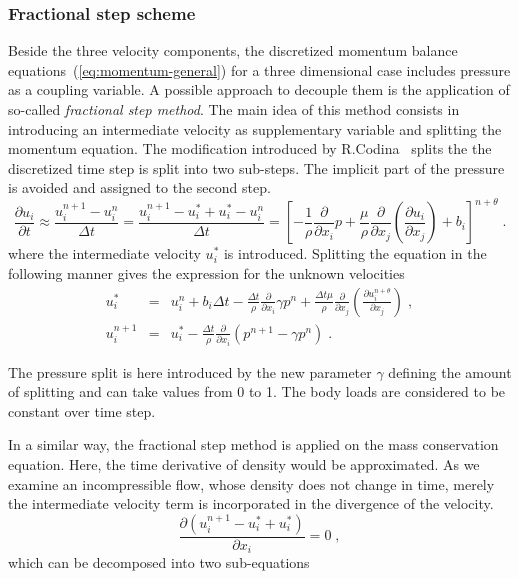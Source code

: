 \documentclass[a4paper]{article}
\newcommand{\pard}[2]{\frac{\partial{#1}}{\partial{#2}}}
\begin{document}
\subsubsection{Fractional step scheme}
Beside the three velocity components, the discretized momentum balance equations~(\ref{eq:momentum-general}) for a three dimensional case includes pressure as a coupling variable. A possible approach to decouple them is the application of so-called \emph{fractional step method}. The main idea of this method consists in introducing an intermediate velocity as supplementary variable and splitting the momentum equation. The modification introduced by R.Codina~\cite{Codina01} splits the the discretized time step is split into two sub-steps. The implicit part of the pressure is avoided and assigned to the second step.
\begin{equation}
  \pard{u_i}{t} \approx \frac{u^{n+1}_i-u^n_i}{\Delta t}=\frac{u^{n+1}_i-u^*_i+u^*_i-u^n_i}{\Delta t}= \left[ - \frac{1}{\rho}\frac{\partial}{\partial x_i}p+\frac{\mu}{\rho}\frac{\partial}{\partial x_j}\left(\frac{\partial u_i}{\partial x_j}\right)+b_i\right]^{n+\theta}\;.
\end{equation}
where the intermediate velocity $u^*_i$ is introduced. Splitting the equation in the following manner gives the expression for the unknown velocities
\begin{eqnarray}\label{rce:uistar}
    u^*_i &=& u^n_i+b_i\Delta t - \frac{\Delta t}{\rho}\pard{}{x_i}\gamma p^n+\frac{\Delta t\mu}{\rho}\pard{}{x_j}\left(\pard{u^{n+\theta}_i}{x_j}\right)\;,\\
    u^{n+1}_i &=& u^*_i- \frac{\Delta t}{\rho}\pard{}{x_i}(p^{n+1}-\gamma p^n)\;. \label{eq:uin1}
\end{eqnarray}

The pressure split is here introduced by the new parameter $\gamma$ defining the amount of splitting and can take values from 0 to 1. The body loads are considered to be constant over time step.
\par
In a similar way, the fractional step method is applied on the mass conservation equation. Here, the time derivative of density would be approximated. As we examine an incompressible flow, whose density does not change in time, merely the intermediate velocity term is incorporated in the divergence of the velocity.
\begin{equation}
  \pard{(u^{n+1}_i-u^*_i+u^*_i)}{x_i} = 0 \;,
\end{equation}
which can be decomposed into two sub-equations
\end{document}
